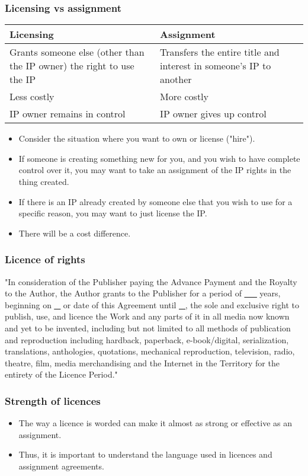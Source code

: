 \documentclass[11pt]{article}
\begin{document}
\subsubsection{Licensing vs assignment}
\label{sec:org02b0e30}
\begin{center}
\begin{tabular}{m{16em}|m{16em}}
Licensing & Assignment\\
\hline
Grants someone else (other than the IP owner) the right to use the IP & Transfers the entire title and interest in someone's IP to another\\
\hline
Less costly & More costly\\
\hline
IP owner remains in control & IP owner gives up control\\
\end{tabular}
\end{center}

\begin{itemize}
\item Consider the situation where you want to own or license ("hire").
\item If someone is creating something new for you, and you wish to have complete control over it, you may want to take an assignment of the IP rights in the thing created.
\item If there is an IP already created by someone else that you wish to use for a specific reason, you may want to just license the IP.
\item There will be a cost difference.
\end{itemize}
\subsubsection{Licence of rights}
\label{sec:orgec80f2f}
"In consideration of the Publisher paying the Advance Payment and the Royalty to the Author, the Author grants to the Publisher for a period of \uline{\uline{\_\_}} years, beginning on \uline{\uline{\uline{\_}}} or date of this Agreement until \uline{\uline{\uline{\uline{\_}}}}, the sole and exclusive right to publish, use, and licence the Work and any parts of it in all media now known and yet to be invented, including but not limited to all methods of publication and reproduction including hardback, paperback, e-book/digital, serialization, translations, anthologies, quotations, mechanical reproduction, television, radio, theatre, film, media merchandising and the Internet in the Territory for the entirety of the Licence Period."
\subsubsection{Strength of licences}
\label{sec:org4296a22}
\begin{itemize}
\item The way a licence is worded can make it almost as strong or effective as an assignment.
\item Thus, it is important to understand the language used in licences and assignment agreements.
\end{itemize}
\end{document}
